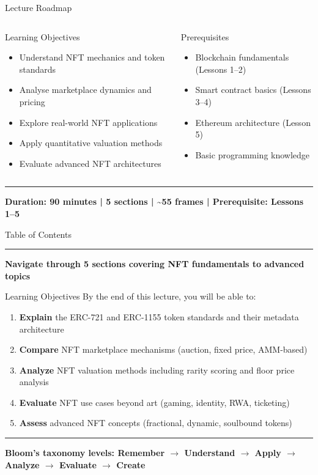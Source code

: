 \documentclass[8pt,aspectratio=169]{beamer}
\newcommand{\bottomnote}[1]{\vfill\vspace{-2mm}\textcolor{mllavender2}{\rule{\textwidth}{0.4pt}}\vspace{1mm}\footnotesize\textbf{#1}}
\begin{document}
\begin{frame}{Lecture Roadmap}
\vspace{3mm}
\begin{columns}[T]
\begin{block}{Learning Objectives}
\begin{itemize}\setlength{\itemsep}{1pt}
  \item Understand NFT mechanics and token standards
  \item Analyse marketplace dynamics and pricing
  \item Explore real-world NFT applications
  \item Apply quantitative valuation methods
  \item Evaluate advanced NFT architectures
\end{itemize}
\end{block}
\begin{block}{Prerequisites}
\begin{itemize}\setlength{\itemsep}{1pt}
  \item Blockchain fundamentals (Lessons 1--2)
  \item Smart contract basics (Lessons 3--4)
  \item Ethereum architecture (Lesson 5)
  \item Basic programming knowledge
\end{itemize}
\end{block}
\end{columns}
\bottomnote{Duration: 90 minutes | 5 sections | \textasciitilde55 frames | Prerequisite: Lessons 1--5}
\end{frame}

\begin{frame}{Table of Contents}
\tableofcontents
\bottomnote{Navigate through 5 sections covering NFT fundamentals to advanced topics}
\end{frame}

\begin{frame}{Learning Objectives}
By the end of this lecture, you will be able to:
\begin{enumerate}
\item \textbf{Explain} the ERC-721 and ERC-1155 token standards and their metadata architecture
\item \textbf{Compare} NFT marketplace mechanisms (auction, fixed price, AMM-based)
\item \textbf{Analyze} NFT valuation methods including rarity scoring and floor price analysis
\item \textbf{Evaluate} NFT use cases beyond art (gaming, identity, RWA, ticketing)
\item \textbf{Assess} advanced NFT concepts (fractional, dynamic, soulbound tokens)
\end{enumerate}
\bottomnote{Bloom's taxonomy levels: Remember $\rightarrow$ Understand $\rightarrow$ Apply $\rightarrow$ Analyze $\rightarrow$ Evaluate $\rightarrow$ Create}
\end{frame}
\end{document}
